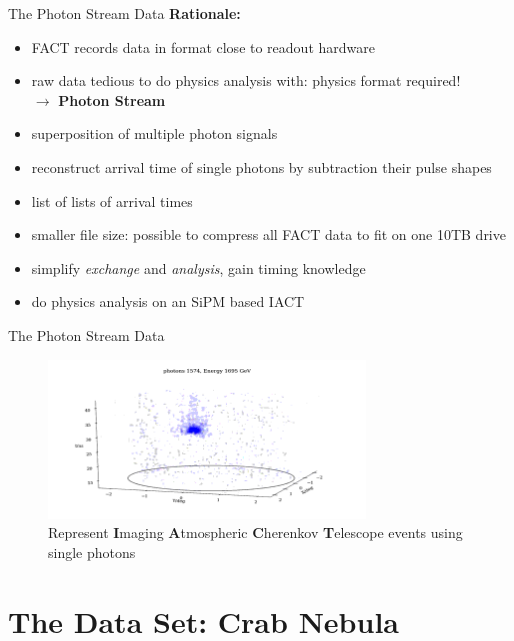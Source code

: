 \begin{frame}[t]{The Photon Stream Data}
    \large{\textbf{Rationale:}}
    \begin{itemize}
        \item FACT records data in format close to readout hardware
        \item raw data tedious to do physics analysis with: physics format required! \\ $\rightarrow$ \textbf{Photon Stream}
        \item superposition of multiple photon signals
        \item reconstruct arrival time of single photons by subtraction their pulse shapes
        \item list of lists of arrival times 
        \item smaller file size: possible to compress all FACT data to fit on one 10TB drive 
        \item simplify \textit{exchange} and \textit{analysis}, gain timing knowledge
        \item do physics analysis on an SiPM based IACT
    \end{itemize}
\end{frame}

\begin{frame}[t]{The Photon Stream Data}
    \begin{figure}
        \centering
        \includegraphics[width=0.75\textwidth]{fig/event/example_event_small-15.png}
        \caption{Represent \textbf{I}maging \textbf{A}tmospheric \textbf{C}herenkov \textbf{T}elescope events using single photons}
    \end{figure}
\end{frame}

\section{The Data Set: Crab Nebula}

